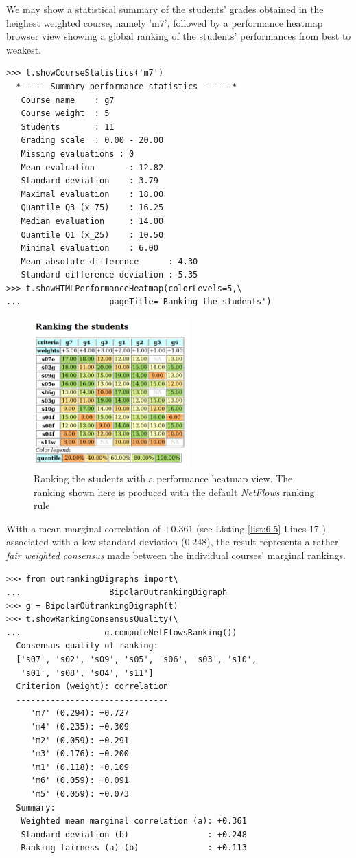 We may show a statistical summary of the students' grades obtained in the heighest weighted course, namely 'm7', followed by a performance heatmap browser view showing a global ranking of the students' performances from best to weakest.
\begin{lstlisting}[caption={Student performance summary statistics per course},label=list:6.6]
>>> t.showCourseStatistics('m7')
  *----- Summary performance statistics ------*
   Course name    : g7
   Course weight  : 5
   Students       : 11
   Grading scale  : 0.00 - 20.00
   Missing evaluations : 0
   Mean evaluation       : 12.82
   Standard deviation    : 3.79
   Maximal evaluation    : 18.00
   Quantile Q3 (x_75)    : 16.25
   Median evaluation     : 14.00
   Quantile Q1 (x_25)    : 10.50
   Minimal evaluation    : 6.00
   Mean absolute difference      : 4.30
   Standard difference deviation : 5.35
>>> t.showHTMLPerformanceHeatmap(colorLevels=5,\
...                  pageTitle='Ranking the students')
\end{lstlisting}
\begin{figure}[h]
\sidecaption
\includegraphics[width=6cm]{Figures/rankingStudents.png}
\caption{Ranking the students with a performance heatmap view. The ranking shown here is produced with the default \emph{NetFlows} ranking rule}
\label{fig:6.4}       %
\end{figure}

With a mean marginal correlation of $+0.361$ (see Listing \ref{list:6.5} Lines 17-) associated with a low standard deviation ($0.248$), the result represents a rather \emph{fair weighted consensus} made between the individual courses' marginal rankings.
\begin{lstlisting}[caption={Consensus quality of the students's ranking},label=list:6.7]
>>> from outrankingDigraphs import\
...                  BipolarOutrankingDigraph
>>> g = BipolarOutrankingDigraph(t)
>>> t.showRankingConsensusQuality(\
...                 g.computeNetFlowsRanking())
  Consensus quality of ranking:
  ['s07', 's02', 's09', 's05', 's06', 's03', 's10',
   's01', 's08', 's04', 's11']
  Criterion (weight): correlation
  -------------------------------
     'm7' (0.294): +0.727
     'm4' (0.235): +0.309
     'm2' (0.059): +0.291
     'm3' (0.176): +0.200
     'm1' (0.118): +0.109
     'm6' (0.059): +0.091
     'm5' (0.059): +0.073
  Summary:
   Weighted mean marginal correlation (a): +0.361
   Standard deviation (b)                : +0.248
   Ranking fairness (a)-(b)              : +0.113
\end{lstlisting}
   

